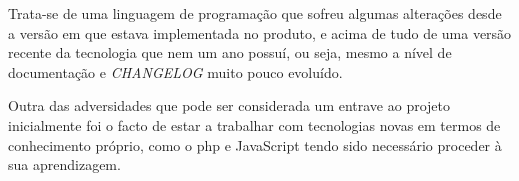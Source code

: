 Trata-se de uma linguagem de programação que sofreu algumas alterações desde a versão em que estava implementada no produto, e acima de tudo de uma versão recente da tecnologia que nem um ano possuí, ou seja, mesmo a nível de documentação e \textit{CHANGELOG} muito pouco evoluído.

Outra das adversidades que pode ser considerada um entrave ao projeto inicialmente foi o facto de estar a trabalhar com tecnologias novas em termos de conhecimento próprio, como o \acrshort{php} e JavaScript tendo sido necessário proceder à sua aprendizagem.

